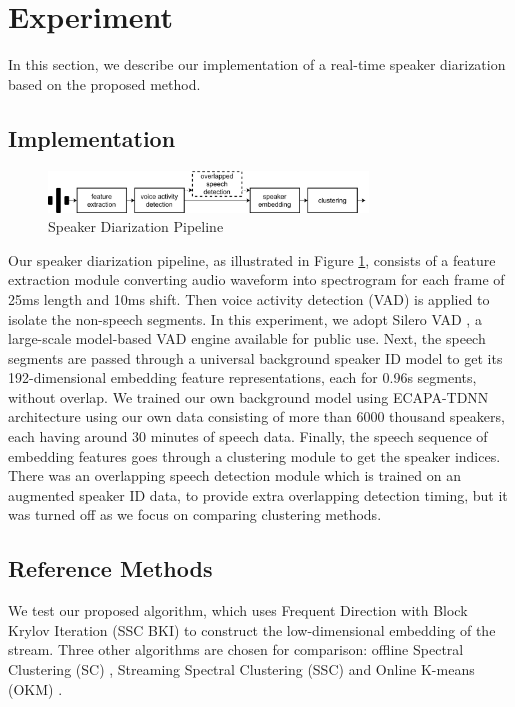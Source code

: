 \section{Experiment}
In this section, we describe our implementation of a real-time speaker diarization based on the proposed method.

\subsection{Implementation}
\begin{figure}[htb]
    \begin{minipage}[b]{1.0\linewidth}
    \centering
    \centerline{\includegraphics[width=8.5cm]{assets/speaker_diarization.png}}
    \end{minipage}
\caption{Speaker Diarization Pipeline}
\label{fig:speaker_diarization}
\end{figure}

Our speaker diarization pipeline, as illustrated in Figure \ref{fig:speaker_diarization}, consists of a feature extraction module converting audio waveform into spectrogram for each frame of 25ms length and 10ms shift. Then voice activity detection (VAD) is applied to isolate the non-speech segments. In this experiment, we adopt Silero VAD \cite{SileroVAD}, a large-scale model-based VAD engine available for public use. Next, the speech segments are passed through a universal background speaker ID model to get its 192-dimensional embedding feature representations, each for 0.96s segments, without overlap. We trained our own background model using ECAPA-TDNN architecture \cite{dawalatabad21_interspeech} using our own data consisting of more than 6000 thousand speakers, each having around 30 minutes of speech data.  Finally, the speech sequence of embedding features goes through a clustering module to get the speaker indices.  There was an overlapping speech detection module which is trained on an augmented speaker ID data, to provide extra overlapping detection timing, but it was turned off as we focus on comparing clustering methods.

\subsection{Reference Methods}
We test our proposed algorithm, which uses Frequent Direction with Block Krylov Iteration (SSC BKI) to construct the low-dimensional embedding of the stream. Three other algorithms are chosen for comparison: offline Spectral Clustering (SC) \cite{ng2001spectral}, Streaming Spectral Clustering (SSC) \cite{yoo2016streaming} and Online K-means (OKM) \cite{NIPS2011_52c67099}.

